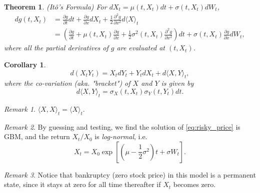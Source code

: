 \documentclass[a4paper,12pt]{article}
\numberwithin{equation}{section}
\newtheorem{theorem}{Theorem}[section]
\newtheorem{corollary}{Corollary}[theorem]
\theoremstyle{definition}
\theoremstyle{remark}
\newtheorem{remark}{Remark}[section]
\begin{document}
\begin{theorem}
(It\^o's Formula)
For $dX_t = \mu(t,X_t)dt + \sigma(t,X_t)dW_t$, 
\begin{equation}
    \label{eq:ito_general}
    \begin{split}
        dg(t,X_t) & = \frac{\partial g}{\partial t}dt+\frac{\partial g}{\partial x}dX_{t}+\frac{1}{2} \frac{\partial^{2} g}{\partial {x}^{2}}d\langle X\rangle_t \\
        & = \left(\frac{\partial g}{\partial t}+\mu(t,X_t)\frac{\partial g}{\partial x}+\frac{1}{2}\sigma^{2}(t,X_t)\frac{\partial^{2} g}{\partial {x}^{2}}\right)dt + \sigma(t,X_t)\frac{\partial g}{\partial x}dW_t ,
    \end{split}
\end{equation}
where all the partial derivatives of $g$ are evaluated at $(t,X_t)$.
\end{theorem}

\begin{corollary}
\begin{equation}
\label{eq:ito_multi}
    d(X_{t}Y_{t})=X_{t}dY_{t}+Y_{t}dX_{t}+d\langle X,Y\rangle_t,
\end{equation}
where the co-variation (aka. "bracket") of $X$ and $Y$ is given by 
\begin{equation}
    d\langle X,Y\rangle_t = \sigma_{X}(t,X_t)\sigma_{Y}(t,Y_t)dt.
\end{equation}      
\end{corollary}

\begin{remark}
    $\langle X,X\rangle_{t}=\langle X\rangle_t$.
\end{remark}

\begin{remark}
By guessing and testing, we find the solution of 
\eqref{eq:risky_price} is GBM, and the return $X_{t}/X_{0}$ is 
\textit{log-normal}, i.e.
\begin{equation}
\label{eq:GBM}
    X_{t}=
    X_{0}\exp\left[(\mu-\frac{1}{2}\sigma^{2})t+\sigma W_{t}\right].
\end{equation}
\end{remark}

\begin{remark}
Notice that bankruptcy (zero stock price) in this model is a 
permanent state, since it stays at zero for all time thereafter 
if $X_t$ becomes zero.
\end{remark}
\end{document}
